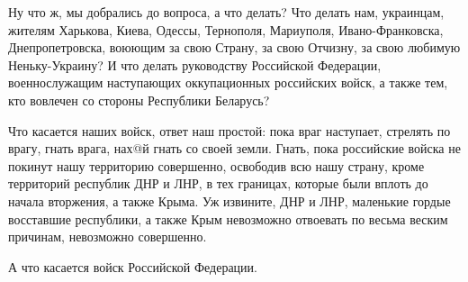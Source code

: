 Ну что ж, мы добрались до вопроса, а что делать? Что делать нам, украинцам,
жителям Харькова, Киева, Одессы, Тернополя, Мариуполя, Ивано-Франковска,
Днепропетровска, воюющим за свою Страну, за свою Отчизну, за свою любимую
Неньку-Украину? И что делать руководству Российской Федерации, военнослужащим
наступающих оккупационных российских войск, а также тем, кто вовлечен со
стороны Республики Беларусь?

Что касается наших войск, ответ наш простой: пока враг наступает, стрелять по
врагу, гнать врага, нах@й гнать со своей земли. Гнать, пока российские войска
не покинут нашу территорию совершенно, освободив всю нашу страну, кроме
территорий республик ДНР и ЛНР, в тех границах, которые были вплоть до начала
вторжения, а также Крыма. Уж извините, ДНР и ЛНР, маленькие гордые восставшие
республики, а также Крым невозможно отвоевать по весьма веским причинам,
невозможно совершенно.

А что касается войск Российской Федерации.
